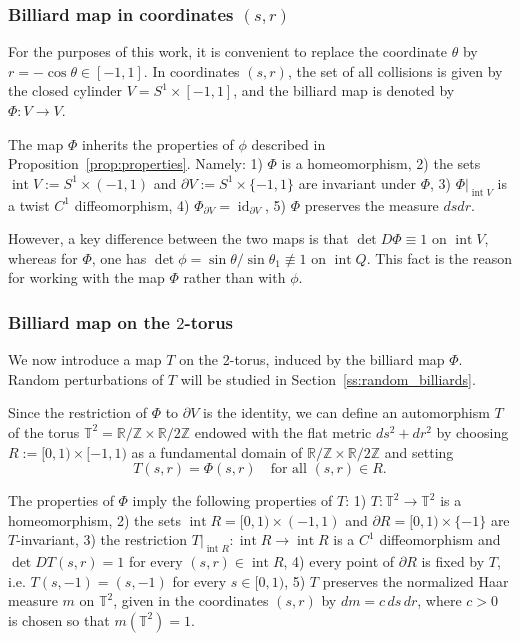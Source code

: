 \documentclass[a4paper,12pt,reqno]{amsart}
\numberwithin{equation}{section}
\newtheorem{remark}[theorem]{Remark}
\newcommand{\Tt}{{\mathbb{T}}}
\begin{document}
\subsubsection{Billiard map in coordinates $(s,r)$}
For the purposes of this work, it is convenient to replace the coordinate $\theta$ by $r=-\cos \theta \in [-1,1]$. In coordinates $(s,r)$, the set of all collisions is given by the closed cylinder $V = S^1 \times [-1,1]$, and the billiard map is denoted by $\Phi \colon V \to V$.

The map $\Phi$ inherits the properties of $\phi$ described in Proposition~\ref{prop:properties}. Namely: 1) $\Phi$ is a homeomorphism, 2) the sets $\operatorname{int} V := S^1 \times (-1, 1)$ and $\partial V := S^1 \times \{-1, 1\}$ are invariant under $\Phi$, 3) $\Phi|_{\operatorname{int} V}$ is a twist $C^1$ diffeomorphism, 4) $\Phi_{\partial V} = \operatorname{id}_{\partial V}$, 5) $\Phi$ preserves the measure $ds dr$. 

However, a key difference between the two maps is that $\det D\Phi \equiv 1$ on $\operatorname{int} V$, whereas for $\Phi$, one has  $\det \phi = \sin \theta / \sin \theta_1 \not\equiv 1$ on $\operatorname{int} Q$. This fact is the reason for working with the map $\Phi$ rather than with $\phi$.



\subsubsection{Billiard map on the $2$-torus} 
\label{su:torus}
We now introduce a map $T$ on the 2-torus, induced by the billiard map $\Phi$. Random perturbations of $T$ will be studied in Section~\ref{ss:random_billiards}.

Since the restriction of $\Phi$ to $\partial V$ is the identity, we can define an automorphism $T$ of the torus $\Tt^2 = \mathbb{R}/\mathbb{Z} \times \mathbb{R}/2 \mathbb{Z}$ endowed with the flat metric $ds^2+dr^2$ by choosing $R:=[0,1) \times [-1,1)$ as a fundamental domain of $\mathbb{R}/\mathbb{Z} \times \mathbb{R}/2 \mathbb{Z}$ and setting 
\[
T(s,r) = \Phi(s,r) \quad \text{for all } (s,r) \in R.
\] 

The properties of $\Phi$ imply the following properties of $T$: 1) $T\colon\mathbb T^2\to\mathbb T^2$ is a homeomorphism, 2) the sets $\operatorname{int}R=[0,1)\times(-1,1)$ and $\partial R=[0,1)\times\{-1\}$ are $T$-invariant, 3) the restriction $T|_{\operatorname{int}R}\colon\operatorname{int}R\to\operatorname{int}R$ is a $C^1$ diffeomorphism and $\det DT(s,r)=1$ for every $(s,r)\in\operatorname{int}R$, 4) every point of $\partial R$ is fixed by $T$, i.e. 
$T(s,-1)=(s,-1)$ for every $s\in[0,1)$, 5) $T$ preserves the normalized Haar measure $m$ on $\mathbb T^2$, given in the coordinates $(s,r)$ by $dm=c\,ds\,dr$,
where $c>0$ is chosen so that $m(\mathbb T^2)=1$.
\end{document}
